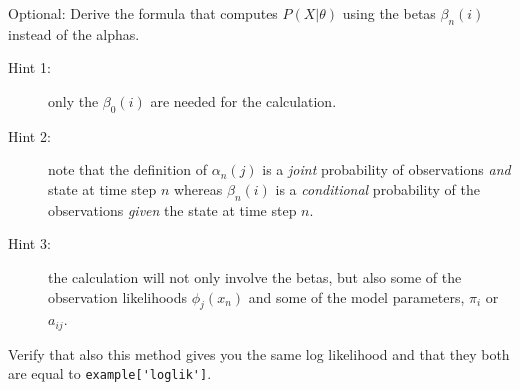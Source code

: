 \documentclass{nada-ten}
\begin{document}
\begin{mdframed}
Optional: Derive the formula that computes $P(X|\theta)$ using the betas $\beta_n(i)$ instead of the alphas.
\begin{description}
 \item[Hint 1:] only the $\beta_0(i)$ are needed for the calculation.
 \item[Hint 2:] note that the definition of $\alpha_n(j)$ is a \emph{joint} probability of observations \emph{and} state at time step $n$ whereas $\beta_n(i)$ is a \emph{conditional} probability of the observations \emph{given} the state at time step $n$.
 \item[Hint 3:] the calculation will not only involve the betas, but also some of the observation likelihoods $\phi_j(x_n)$ and some of the model parameters, $\pi_i$ or $a_{ij}$.
\end{description}

Verify that also this method gives you the same log likelihood and that they both are equal to \verb|example['loglik']|.
\end{mdframed}



\end{document}
